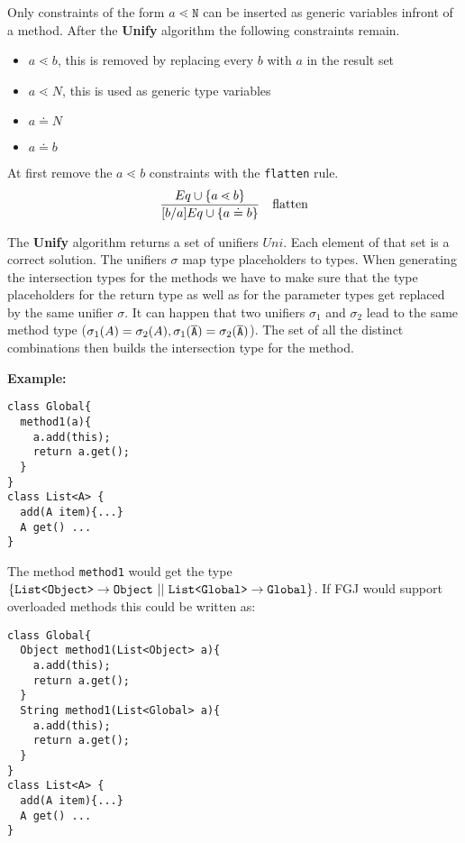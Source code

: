 \documentclass[a4paper,USenglish,cleveref, autoref, thm-restate]{lipics-v2021}
\begin{document}
Only constraints of the form $a \lessdot \texttt{N}$ can be inserted as generic variables infront of a method.
After the \textbf{Unify} algorithm the following constraints remain.
\begin{itemize}
  \item $a \lessdot b$, this is removed by replacing every $b$ with $a$ in the result set
  \item $a \lessdot N$, this is used as generic type variables
  \item $a \doteq N$
  \item $a \doteq b$
\end{itemize}

At first remove the $a \lessdot b$ constraints with the \texttt{flatten} rule.
\begin{align*}
  \frac{\displaystyle 
    Eq \cup \{  a \lessdot b \}
  }{\displaystyle 
    [b/a]Eq \cup \{  a \doteq b  \}
  }
  \quad \text{flatten}
\end{align*}


The \textbf{Unify} algorithm returns a set of unifiers ${Uni}$.
Each element of that set is a correct solution.
The unifiers $\sigma$ map type placeholders to types.
When generating the intersection types for the methods we have to make sure that the
type placeholders for the return type as well as for the parameter types get replaced by the same unifier $\sigma$.
It can happen that two unifiers $\sigma_1$ and $\sigma_2$ lead to the same method type ($\sigma_1(A) = \sigma_2(A), \sigma_1(\overline{\tt A}) = \sigma_2(\overline{\tt A})$).
The set of all the distinct combinations then builds the intersection type for the method.

\textbf{Example:}
\begin{lstlisting}
class Global{
  method1(a){
    a.add(this);
    return a.get();
  }
}
class List<A> {
  add(A item){...}
  A get() ...
}
\end{lstlisting}

The method \texttt{method1} would get the type $\{  \mathtt{List \texttt{<} Object \texttt{>} } \to \texttt{Object}
\ || \ \mathtt{List \texttt{<} Global \texttt{>} } \to \texttt{Global} \}$.
If FGJ would support overloaded methods this could be written as:
\begin{lstlisting}
class Global{
  Object method1(List<Object> a){
    a.add(this);
    return a.get();
  }
  String method1(List<Global> a){
    a.add(this);
    return a.get();
  }
}
class List<A> {
  add(A item){...}
  A get() ...
}
\end{lstlisting}
\end{document}

